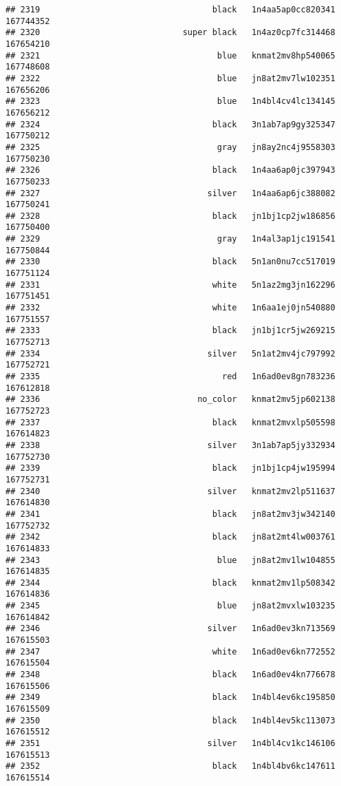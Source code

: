 \documentclass[
]{article}
\begin{document}
\begin{verbatim}
## 2319                                   black   1n4aa5ap0cc820341 167744352
## 2320                             super black   1n4az0cp7fc314468 167654210
## 2321                                    blue   knmat2mv8hp540065 167748608
## 2322                                    blue   jn8at2mv7lw102351 167656206
## 2323                                    blue   1n4bl4cv4lc134145 167656212
## 2324                                   black   3n1ab7ap9gy325347 167750212
## 2325                                    gray   jn8ay2nc4j9558303 167750230
## 2326                                   black   1n4aa6ap0jc397943 167750233
## 2327                                  silver   1n4aa6ap6jc388082 167750241
## 2328                                   black   jn1bj1cp2jw186856 167750400
## 2329                                    gray   1n4al3ap1jc191541 167750844
## 2330                                   black   5n1an0nu7cc517019 167751124
## 2331                                   white   5n1az2mg3jn162296 167751451
## 2332                                   white   1n6aa1ej0jn540880 167751557
## 2333                                   black   jn1bj1cr5jw269215 167752713
## 2334                                  silver   5n1at2mv4jc797992 167752721
## 2335                                     red   1n6ad0ev8gn783236 167612818
## 2336                                no_color   knmat2mv5jp602138 167752723
## 2337                                   black   knmat2mvxlp505598 167614823
## 2338                                  silver   3n1ab7ap5jy332934 167752730
## 2339                                   black   jn1bj1cp4jw195994 167752731
## 2340                                  silver   knmat2mv2lp511637 167614830
## 2341                                   black   jn8at2mv3jw342140 167752732
## 2342                                   black   jn8at2mt4lw003761 167614833
## 2343                                    blue   jn8at2mv1lw104855 167614835
## 2344                                   black   knmat2mv1lp508342 167614836
## 2345                                    blue   jn8at2mvxlw103235 167614842
## 2346                                  silver   1n6ad0ev3kn713569 167615503
## 2347                                   white   1n6ad0ev6kn772552 167615504
## 2348                                   black   1n6ad0ev4kn776678 167615506
## 2349                                   black   1n4bl4ev6kc195850 167615509
## 2350                                   black   1n4bl4ev5kc113073 167615512
## 2351                                  silver   1n4bl4cv1kc146106 167615513
## 2352                                   black   1n4bl4bv6kc147611 167615514

\end{verbatim}
\end{document}
